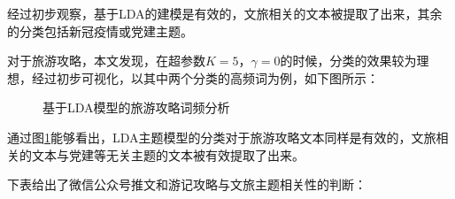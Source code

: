 \documentclass[bwprint]{gmcmthesis}
\begin{document}
经过初步观察，基于LDA的建模是有效的，文旅相关的文本被提取了出来，其余的分类包括新冠疫情或党建主题。

对于旅游攻略，本文发现，在超参数$K=5$，$\gamma=0$的时候，分类的效果较为理想，经过初步可视化，以其中两个分类的高频词为例，如下图所示：

\begin{figure}[H]
    \centering
    \hspace{0in}
    \caption{基于LDA模型的旅游攻略词频分析}
    \label{travel_cipin}
\end{figure}

通过图\ref{travel_cipin}能够看出，LDA主题模型的分类对于旅游攻略文本同样是有效的，文旅相关的文本与党建等无关主题的文本被有效提取了出来。

下表给出了微信公众号推文和游记攻略与文旅主题相关性的判断：


\cite{wright_latex3_2009}



\end{document}
